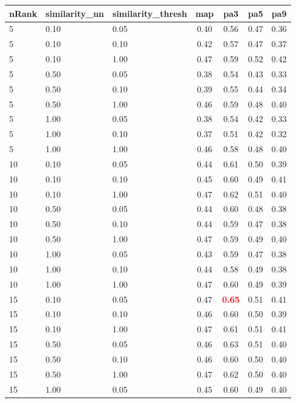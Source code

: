 \documentclass[12pt,a4paper,fleqn]{tufte-handout}
\begin{document}
 
\begin{table}    
\begin{center}    
\scriptsize    
\setlength{\tabcolsep}{.16667em}    
\begin{tabular}{lllcccc}    
nRank & similarity\_nn & similarity\_thresh & map & pa3 & pa5 & pa9 \\    
\hline    
5 & 0.10 & 0.05 & 0.40 & 0.56 & 0.47 & 0.36 \\    
5 & 0.10 & 0.10 & 0.42 & 0.57 & 0.47 & 0.37 \\    
5 & 0.10 & 1.00 & 0.47 & 0.59 & 0.52 & 0.42 \\    
5 & 0.50 & 0.05 & 0.38 & 0.54 & 0.43 & 0.33 \\    
5 & 0.50 & 0.10 & 0.39 & 0.55 & 0.44 & 0.34 \\    
5 & 0.50 & 1.00 & 0.46 & 0.59 & 0.48 & 0.40 \\    
5 & 1.00 & 0.05 & 0.38 & 0.54 & 0.42 & 0.33 \\    
5 & 1.00 & 0.10 & 0.37 & 0.51 & 0.42 & 0.32 \\    
5 & 1.00 & 1.00 & 0.46 & 0.58 & 0.48 & 0.40 \\    
10 & 0.10 & 0.05 & 0.44 & 0.61 & 0.50 & 0.39 \\    
10 & 0.10 & 0.10 & 0.45 & 0.60 & 0.49 & 0.41 \\    
10 & 0.10 & 1.00 & 0.47 & 0.62 & 0.51 & 0.40 \\    
10 & 0.50 & 0.05 & 0.44 & 0.60 & 0.48 & 0.38 \\    
10 & 0.50 & 0.10 & 0.44 & 0.59 & 0.47 & 0.38 \\    
10 & 0.50 & 1.00 & 0.47 & 0.59 & 0.49 & 0.40 \\    
10 & 1.00 & 0.05 & 0.43 & 0.59 & 0.47 & 0.38 \\    
10 & 1.00 & 0.10 & 0.44 & 0.58 & 0.49 & 0.38 \\    
10 & 1.00 & 1.00 & 0.47 & 0.60 & 0.49 & 0.39 \\    
15 & 0.10 & 0.05 & 0.47 & \textbf{\textcolor{red}{0.65}} & 0.51 & 0.41 \\    
15 & 0.10 & 0.10 & 0.46 & 0.60 & 0.50 & 0.39 \\    
15 & 0.10 & 1.00 & 0.47 & 0.61 & 0.51 & 0.41 \\    
15 & 0.50 & 0.05 & 0.46 & 0.63 & 0.51 & 0.40 \\    
15 & 0.50 & 0.10 & 0.46 & 0.60 & 0.50 & 0.40 \\    
15 & 0.50 & 1.00 & 0.47 & 0.62 & 0.50 & 0.40 \\    
15 & 1.00 & 0.05 & 0.45 & 0.60 & 0.49 & 0.40 \\    

\end{tabular}
\end{center}
\end{table}
\end{document}
